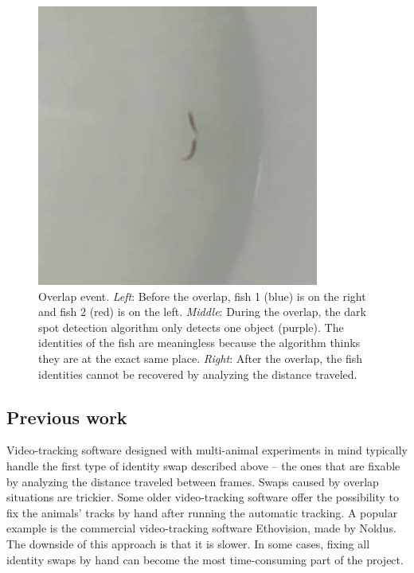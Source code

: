 \documentclass{article}
\newlength{\mylen}
\begin{document}
\begin{figure}[H]
	\includegraphics[height=\mylen]{overlap-event3}
	\caption{Overlap event. 
		\emph{Left}: Before the overlap, fish 1 (blue) is on the right and fish 2 (red) is on the left. 
		\emph{Middle}: During the overlap, the dark spot detection algorithm only detects one object (purple). The identities of the fish are meaningless because the algorithm thinks they are at the exact same place. 
		\emph{Right}: After the overlap, the fish identities cannot be recovered by analyzing the distance traveled.}
	\label{fig:overlap-event}
\end{figure}



\subsection{Previous work}


Video-tracking software designed with multi-animal experiments in mind typically handle the first type of identity swap described above -- the ones that are fixable by analyzing the distance traveled between frames. Swaps caused by overlap situations are trickier. Some older video-tracking software offer the possibility to fix the animals' tracks by hand after running the automatic tracking. A popular example is the commercial video-tracking software Ethovision, made by Noldus. The downside of this approach is that it is slower. In some cases, fixing all identity swaps by hand can become the most time-consuming part of the project. 
\end{document}
